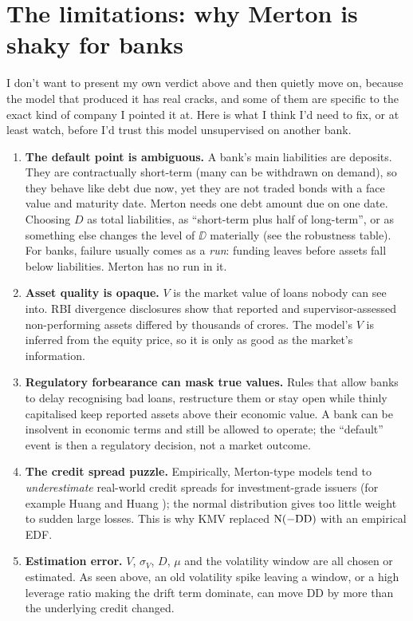 \section{The limitations: why Merton is shaky for banks}
\label{sec:limits}
I don't want to present my own verdict above and then quietly move on, because the model that produced it has real cracks, and some of them are specific to the exact kind of company I pointed it at. Here is what I think I'd need to fix, or at least watch, before I'd trust this model unsupervised on another bank.
\begin{enumerate}
\item \textbf{The default point is ambiguous.} A bank's main liabilities are deposits. They are contractually short-term (many can be withdrawn on demand), so they behave like debt due now, yet they are not traded bonds with a face value and maturity date. Merton needs one debt amount due on one date. Choosing $D$ as total liabilities, as ``short-term plus half of long-term'', or as something else changes the level of $\DD$ materially (see the robustness table). For banks, failure usually comes as a \emph{run}: funding leaves before assets fall below liabilities. Merton has no run in it.
\item \textbf{Asset quality is opaque.} $V$ is the market value of loans nobody can see into. RBI divergence disclosures show that reported and supervisor-assessed non-performing assets differed by thousands of crores. The model's $V$ is inferred from the equity price, so it is only as good as the market's information.
\item \textbf{Regulatory forbearance can mask true values.} Rules that allow banks to delay recognising bad loans, restructure them or stay open while thinly capitalised keep reported assets above their economic value. A bank can be insolvent in economic terms and still be allowed to operate; the ``default'' event is then a regulatory decision, not a market outcome.
\item \textbf{The credit spread puzzle.} Empirically, Merton-type models tend to \emph{underestimate} real-world credit spreads for investment-grade issuers (for example Huang and Huang \cite{huang2012}); the normal distribution gives too little weight to sudden large losses. This is why KMV replaced $\mathrm{N}(-\mathrm{DD})$ with an empirical EDF.
\item \textbf{Estimation error.} $V$, $\sigma_V$, $D$, $\mu$ and the volatility window are all chosen or estimated. As seen above, an old volatility spike leaving a window, or a high leverage ratio making the drift term dominate, can move DD by more than the underlying credit changed.
\end{enumerate}
